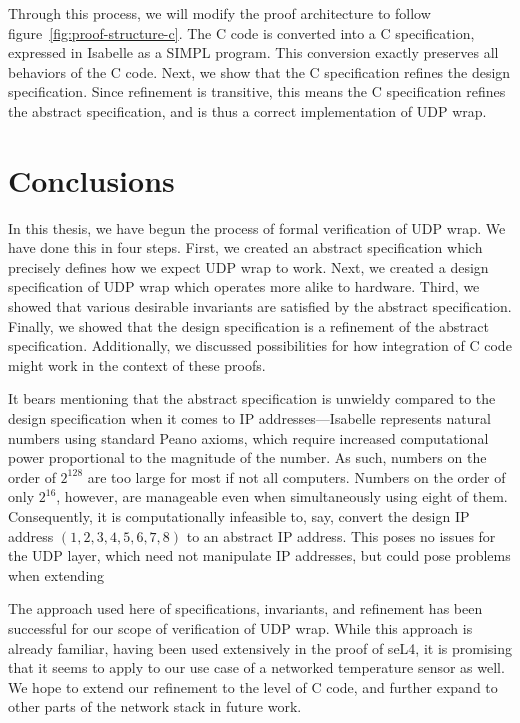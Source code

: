 \documentclass[twoside]{memoir}
\begin{document}
Through this process, we will modify the proof architecture to follow figure~\ref{fig:proof-structure-c}.
The C code is converted into a C specification, expressed in Isabelle as a SIMPL program.
This conversion exactly preserves all behaviors of the C code.
Next, we show that the C specification refines the design specification.
Since refinement is transitive, this means the C specification refines the abstract specification,
and is thus a correct implementation of UDP wrap.

\chapter{Conclusions}
In this thesis, we have begun the process of formal verification of UDP wrap.
We have done this in four steps.
First, we created an abstract specification which precisely defines
how we expect UDP wrap to work.
Next, we created a design specification of UDP wrap which operates more alike to hardware.
Third, we showed that various desirable invariants are satisfied by the abstract specification.
Finally, we showed that the design specification is a refinement of the abstract specification.
Additionally, we discussed possibilities for how integration of C code might work in the
context of these proofs.

It bears mentioning that the abstract specification is unwieldy
compared to the design specification
when it comes to IP addresses---Isabelle represents natural numbers using standard
Peano axioms, %
which require increased computational power proportional to the magnitude of the number.
As such, numbers on the order of $2^128$ are too large for most if not all computers.
Numbers on the order of only $2^16$, however, are manageable even when simultaneously
using eight of them.
Consequently, it is computationally infeasible to, say, convert the design IP address
$(1,2,3,4,5,6,7,8)$ to an abstract IP address.
This poses no issues for the UDP layer, which need not manipulate IP addresses,
but could pose problems when extending 

The approach used here of specifications, invariants, and refinement
has been successful for our scope of verification of UDP wrap.
While this approach is already familiar, having been used extensively in the proof of seL4,
it is promising that it seems to apply to our use case of a networked temperature sensor as well.
We hope to extend our refinement to the level of C code, and further expand to other parts of the
network stack in future work.
\end{document}
